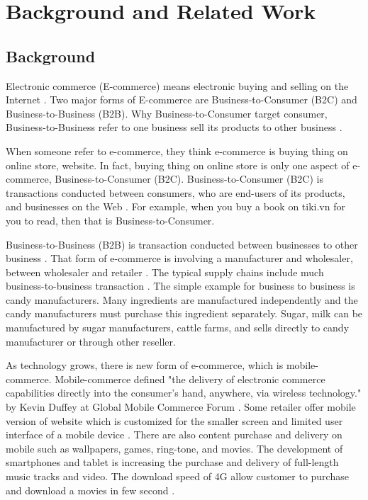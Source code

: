 \documentclass[conference]{IEEEtran}
\begin{document}


\section{Background and Related Work} \label{background}
\subsection{Background}
Electronic commerce (E-commerce) means electronic buying and selling on the Internet \cite{bidgoli2002electronic}. Two major forms of E-commerce are Business-to-Consumer (B2C) and Business-to-Business (B2B). Why Business-to-Consumer target consumer, Business-to-Business refer to one business sell its products to other business \cite{readingEcommerce2009}.

When someone refer to e-commerce, they think e-commerce is buying thing on online store, website. In fact, buying thing on online store is only one aspect of e-commerce, Business-to-Consumer (B2C). Business-to-Consumer (B2C) is transactions conducted between consumers, who are end-users of its products, and businesses on the Web \cite{ec2010Gary}. For example, when you buy a book on tiki.vn for you to read, then that is Business-to-Consumer.

Business-to-Business (B2B) is transaction conducted between businesses to other business \cite{ec2010Gary}. That form of e-commerce is involving a manufacturer and wholesaler, between wholesaler and retailer \cite{btb2015}. The typical supply chains include much business-to-business transaction \cite{btb2015}. The simple example for business to business is candy manufacturers. Many ingredients are manufactured independently and the candy manufacturers must purchase this ingredient separately. Sugar, milk can be manufactured by sugar manufacturers, cattle farms, and sells directly to candy manufacturer or through other reseller.

As technology grows, there is new form of e-commerce, which is mobile-commerce. Mobile-commerce defined "the delivery of electronic commerce capabilities directly into the consumer’s hand, anywhere, via wireless technology." by Kevin Duffey at Global Mobile Commerce Forum \cite{defmobiec}. Some retailer offer mobile version of website which is customized for the smaller screen and limited user interface of a mobile device \cite{ectomobile2015}. There are also content purchase and delivery on mobile such as wallpapers, games, ring-tone, and movies. The development of smartphones and tablet is increasing the purchase and delivery of full-length music tracks and video. The download speed of 4G allow customer to purchase and download a movies in few second \cite{niranjanamurthy2013analysis}.
\end{document}
